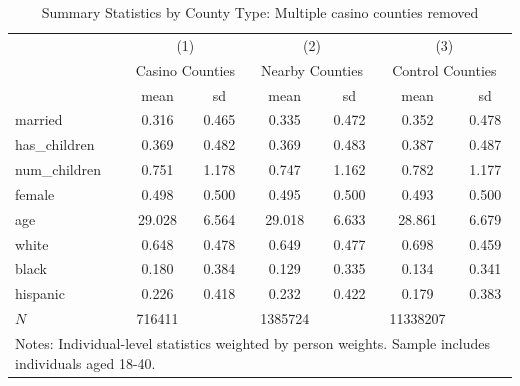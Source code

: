\begin{table}[htbp]\centering
\def\sym#1{\ifmmode^{#1}\else\(^{#1}\)\fi}
\caption{Summary Statistics by County Type: Multiple casino counties removed}
\begin{tabular}{l*{3}{cc}}
\hline\hline
            &\multicolumn{2}{c}{(1)}  &\multicolumn{2}{c}{(2)}  &\multicolumn{2}{c}{(3)}  \\
            &\multicolumn{2}{c}{Casino Counties}&\multicolumn{2}{c}{Nearby Counties}&\multicolumn{2}{c}{Control Counties}\\
            &        mean&          sd&        mean&          sd&        mean&          sd\\
\hline
married     &       0.316&       0.465&       0.335&       0.472&       0.352&       0.478\\
has\_children&       0.369&       0.482&       0.369&       0.483&       0.387&       0.487\\
num\_children&       0.751&       1.178&       0.747&       1.162&       0.782&       1.177\\
female      &       0.498&       0.500&       0.495&       0.500&       0.493&       0.500\\
age         &      29.028&       6.564&      29.018&       6.633&      28.861&       6.679\\
white       &       0.648&       0.478&       0.649&       0.477&       0.698&       0.459\\
black       &       0.180&       0.384&       0.129&       0.335&       0.134&       0.341\\
hispanic    &       0.226&       0.418&       0.232&       0.422&       0.179&       0.383\\
\hline
\(N\)       &      716411&            &     1385724&            &    11338207&            \\
\hline\hline
\multicolumn{7}{l}{\footnotesize Notes: Individual-level statistics weighted by person weights. Sample includes individuals aged 18-40.}\\
\end{tabular}
\end{table}
